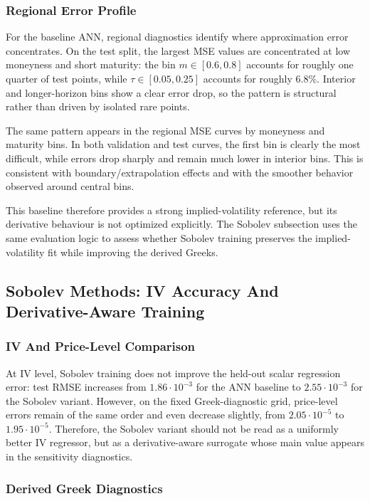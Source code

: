 \subsubsection{Regional Error Profile}

For the baseline ANN, regional diagnostics identify where approximation error concentrates. On the test split, the largest MSE values are concentrated at low moneyness and short maturity: the bin \(m\in[0.6,0.8]\) accounts for roughly one quarter of test points, while \(\tau\in[0.05,0.25]\) accounts for roughly \(6.8\%\). Interior and longer-horizon bins show a clear error drop, so the pattern is structural rather than driven by isolated rare points.

The same pattern appears in the regional MSE curves by moneyness and maturity bins. In both validation and test curves, the first bin is clearly the most difficult, while errors drop sharply and remain much lower in interior bins. This is consistent with boundary/extrapolation effects and with the smoother behavior observed around central bins.

This baseline therefore provides a strong implied-volatility reference, but its derivative behaviour is not optimized explicitly. The Sobolev subsection uses the same evaluation logic to assess whether Sobolev training preserves the implied-volatility fit while improving the derived Greeks.

\subsection{Sobolev Methods: IV Accuracy And Derivative-Aware Training}

\subsubsection{IV And Price-Level Comparison}

At IV level, Sobolev training does not improve the held-out scalar regression error: test RMSE increases from \(1.86\cdot10^{-3}\) for the ANN baseline to \(2.55\cdot10^{-3}\) for the Sobolev variant. However, on the fixed Greek-diagnostic grid, price-level errors remain of the same order and even decrease slightly, from \(2.05\cdot10^{-5}\) to \(1.95\cdot10^{-5}\). Therefore, the Sobolev variant should not be read as a uniformly better IV regressor, but as a derivative-aware surrogate whose main value appears in the sensitivity diagnostics.

\subsubsection{Derived Greek Diagnostics}

